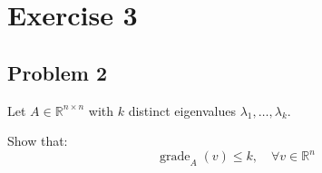 \section{Exercise 3}

\subsection*{Problem 2}
Let $A \in \mathbb{R}^{n \times n}$ with $k$ distinct eigenvalues $\lambda_1, \ldots, \lambda_k$.

Show that:
\[
    \operatorname{grade}_A(v) \leq k, \quad \forall v \in \mathbb{R}^n
\]

